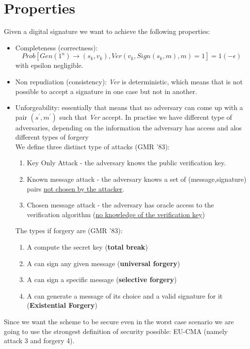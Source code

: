 \documentclass{article}
\begin{document}
\section{Properties}
Given a digital signature we want to achieve the following properties:
\begin{itemize}
\item Completeness (correctness):
\begin{equation}
Prob[Gen(1^n) \rightarrow (s_k,v_k), Ver(v_k, Sign(s_k,m),m) = 1] = 1 (- \epsilon)
\end{equation}
with epsilon negligible.
\item Non repudiation (consistency): \textit{Ver} is deterministic, which means that is not possible to accept a signature in one case but not in another.
\item Unforgeability: essentially that means that no adversary can come up with a pair $(s^{'},m^{'})$ such that \textit{Ver} accept. In practise we have different type of adversaries, depending on the information the adversary has access and alos different types of forgery\\
We define three distinct type of attacks (GMR '83):
\begin{enumerate}
\item  Key Only Attack - the adversary knows the public verification key.
\item Known message attack - the adversary knows a set of (message,signature) pairs \underline{not chosen by the attacker}.
\item Chosen message attack - the adversary has oracle access to the verification algorithm (\underline{no knowledge of the verification key})
\end{enumerate}
The types if forgery are (GMR '83):
\begin{enumerate}
\item A compute the secret key (\textbf{total break})
\item A can sign any given message (\textbf{universal forgery})
\item A can sign a specific message (\textbf{selective forgery})
\item A can generate a message of its choice and a valid signature for it (\textbf{Existential Forgery})
\end{enumerate}
\end{itemize}
Since we want the scheme to be secure even in the worst case scenario we are going to use the strongest definition of security possible: EU-CMA (namely attack 3 and forgery 4).\\
\end{document}
